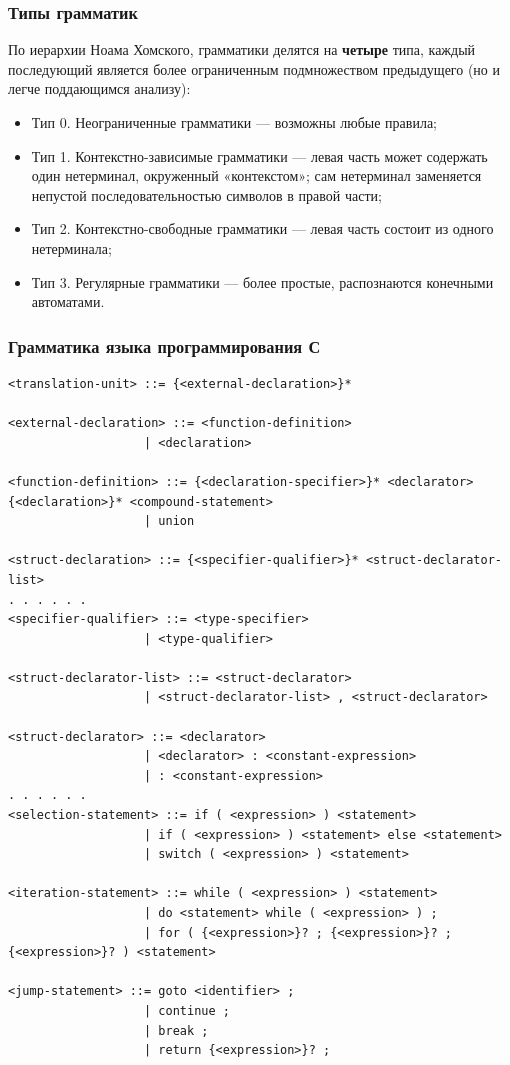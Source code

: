 \documentclass[10pt]{beamer}
\newcommand{\ltprgsize}{\fontsize{5}{5}\selectfont}
\begin{document}
\begin{frame}
  \frametitle{Типы грамматик}
  По иерархии Ноама Хомского, грамматики делятся на \textbf{четыре} типа, каждый последующий является более ограниченным подмножеством предыдущего (но и легче поддающимся анализу):
  \begin{itemize}
    \item Тип 0. Неограниченные грамматики — возможны любые правила;
    \item Тип 1. Контекстно-зависимые грамматики — левая часть может содержать один нетерминал, окруженный «контекстом»; сам нетерминал заменяется непустой последовательностью символов в правой части;
    \item Тип 2. Контекстно-свободные грамматики — левая часть состоит из одного нетерминала;
    \item Тип 3. Регулярные грамматики — более простые, распознаются конечными автоматами.
  \end{itemize}
\end{frame}

\begin{frame}[fragile]
  \frametitle{Грамматика языка программирования С}
  {\ltprgsize
 \begin{verbatim}
<translation-unit> ::= {<external-declaration>}*

<external-declaration> ::= <function-definition>
                   | <declaration>

<function-definition> ::= {<declaration-specifier>}* <declarator> {<declaration>}* <compound-statement>
                   | union

<struct-declaration> ::= {<specifier-qualifier>}* <struct-declarator-list>
. . . . . .
<specifier-qualifier> ::= <type-specifier>
                   | <type-qualifier>

<struct-declarator-list> ::= <struct-declarator>
                   | <struct-declarator-list> , <struct-declarator>

<struct-declarator> ::= <declarator>
                   | <declarator> : <constant-expression>
                   | : <constant-expression>
. . . . . .
<selection-statement> ::= if ( <expression> ) <statement>
                   | if ( <expression> ) <statement> else <statement>
                   | switch ( <expression> ) <statement>

<iteration-statement> ::= while ( <expression> ) <statement>
                   | do <statement> while ( <expression> ) ;
                   | for ( {<expression>}? ; {<expression>}? ; {<expression>}? ) <statement>

<jump-statement> ::= goto <identifier> ;
                   | continue ;
                   | break ;
                   | return {<expression>}? ;
\end{verbatim}}
\end{frame}
\end{document}
